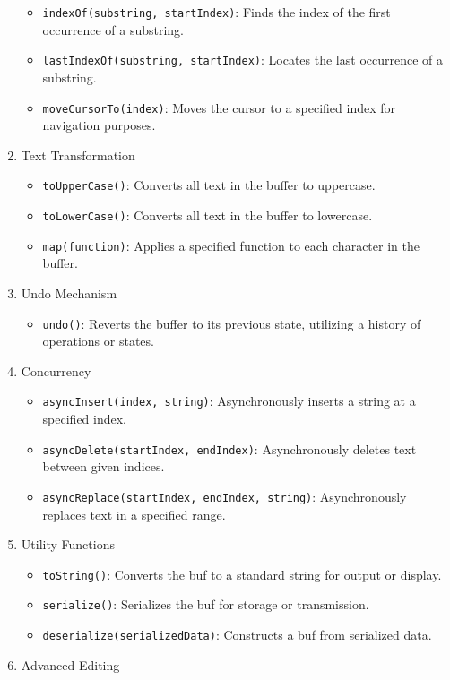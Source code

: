 \begin{enumerate}
  \begin{itemize}
  \tightlist
  \item
    \texttt{indexOf(substring,\ startIndex)}: Finds the index of the
    first occurrence of a substring.
  \item
    \texttt{lastIndexOf(substring,\ startIndex)}: Locates the last
    occurrence of a substring.
  \item
    \texttt{moveCursorTo(index)}: Moves the cursor to a specified index
    for navigation purposes.
  \end{itemize}
\item
  Text Transformation

  \begin{itemize}
  \tightlist
  \item
    \texttt{toUpperCase()}: Converts all text in the buffer to
    uppercase.
  \item
    \texttt{toLowerCase()}: Converts all text in the buffer to
    lowercase.
  \item
    \texttt{map(function)}: Applies a specified function to each
    character in the buffer.
  \end{itemize}
\item
  Undo Mechanism

  \begin{itemize}
  \tightlist
  \item
    \texttt{undo()}: Reverts the buffer to its previous state, utilizing
    a history of operations or states.
  \end{itemize}
\item
  Concurrency

  \begin{itemize}
  \tightlist
  \item
    \texttt{asyncInsert(index,\ string)}: Asynchronously inserts a
    string at a specified index.
  \item
    \texttt{asyncDelete(startIndex,\ endIndex)}: Asynchronously deletes
    text between given indices.
  \item
    \texttt{asyncReplace(startIndex,\ endIndex,\ string)}:
    Asynchronously replaces text in a specified range.
  \end{itemize}
\item
  Utility Functions

  \begin{itemize}
  \tightlist
  \item
    \texttt{toString()}: Converts the buf to a standard string for
    output or display.
  \item
    \texttt{serialize()}: Serializes the buf for storage or
    transmission.
  \item
    \texttt{deserialize(serializedData)}: Constructs a buf from
    serialized data.
  \end{itemize}
\item
  Advanced Editing


\end{enumerate}
